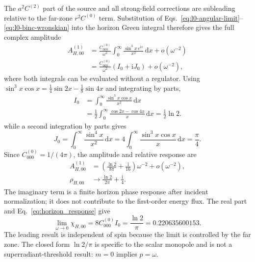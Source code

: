 \documentclass[aps,prd,twocolumn,10pt,nofootinbib,superscriptaddress,floatfix]{revtex4-2}
\newcommand{\dd}{\mathrm{d}}
\newcommand{\ii}{\mathrm{i}}
\begin{document}
The $a^2C^{(2)}$ part of the source and all strong-field corrections are
subleading relative to the far-zone $r^2C^{(0)}$ term.  Substitution of
Eqs.~\eqref{eq:l0-angular-limit}--\eqref{eq:l0-binc-wronskian} into the
horizon Green integral therefore gives the full complex amplitude
\begin{align}
 A_{H,00}^{(1)}
 &=\frac{C^{(0)}_{000}}{\omega^2}
 \int_0^\infty\frac{\sin^3x\,e^{\ii x}}{x^2}\,\dd x
 +o(\omega^{-2})\nonumber\\
 &=\frac{C^{(0)}_{000}}{\omega^2}(I_0+\ii J_0)
 +o(\omega^{-2}),
 \label{eq:l0-green-limit}
\end{align}
where both integrals can be evaluated without a regulator.  Using
$\sin^3x\cos x=\tfrac14\sin 2x-\tfrac18\sin4x$ and integrating by parts,
\begin{equation}
 \begin{split}
 I_0&=\int_0^\infty\frac{\sin^3x\cos x}{x^2}\,\dd x\\
 &=\frac12\int_0^\infty\frac{\cos2x-\cos4x}{x}\,\dd x
 =\frac12\ln2 .
\end{split}
\label{eq:l0-integral}
\end{equation}
while a second integration by parts gives
\begin{equation}
 J_0=\int_0^\infty\frac{\sin^4x}{x^2}\,\dd x
 =4\int_0^\infty\frac{\sin^3x\cos x}{x}\,\dd x
 =\frac{\pi}{4}.
 \label{eq:l0-phase-integral}
\end{equation}
Since $C^{(0)}_{000}=1/(4\pi)$, the amplitude and relative response are
\begin{align}
 A_{H,00}^{(1)}
 &=\left(\frac{\ln2}{8\pi}+\frac{\ii}{16}\right)\omega^{-2}
 +o(\omega^{-2}),\nonumber\\
 \rho_{H,00}
 &\longrightarrow\frac{\ln2}{2\pi}+\frac{\ii}{4}.
 \label{eq:l0-complex-response}
\end{align}
The imaginary term is a finite horizon phase response after incident
normalization; it does not contribute to the first-order energy flux.  The
real part and Eq.~\eqref{eq:horizon_response} give
\begin{equation}
 \boxed{\displaystyle
 \lim_{\omega\to0}\chi_{H,00}
 =8C^{(0)}_{000}I_0
 =\frac{\ln 2}{\pi}=0.220635600153 .}
 \label{eq:l0-exact-response}
\end{equation}
The leading result is independent of spin because the limit is controlled by
the far zone.  The closed form $\ln2/\pi$ is specific to the scalar monopole
and is not a superradiant-threshold result: $m=0$ implies $p=\omega$.
\end{document}
